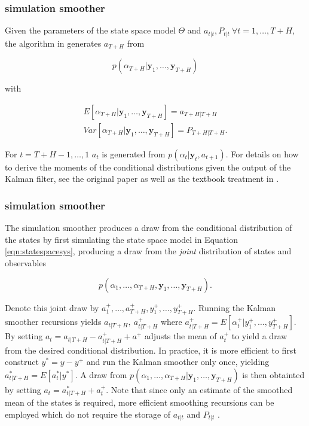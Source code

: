 \documentclass[notitlepage,a4paper,12pt]{article}
\begin{document}
\subsubsection{\citet{carterkohn1994_biomtr} simulation smoother}

Given the parameters of the state space model $\Theta$ and  $a_{t|t}, P_{t|t} \: \forall t = 1, \dots, T+H$, the algorithm in \citet{carterkohn1994_biomtr} generates $a_{T+H}$ from 

$$
p(\alpha_{T+H}|\mathbf{y}_1, \dots, \mathbf{y}_{T+H})
$$

\noindent with

\begin{align*}
    E[\alpha_{T+H}|\mathbf{y}_1, \dots, \mathbf{y}_{T+H}] = a_{T+H|T+H} \\
    Var[\alpha_{T+H}|\mathbf{y}_1, \dots, \mathbf{y}_{T+H}] = P_{T+H|T+H}.
\end{align*}

 For $t=T+H-1, \dots, 1$ $a_t$ is generated from $p(\alpha_{t}|\mathbf{y}_t, a_{t+1})$. For details on how to derive the moments of the conditional distributions given the output of the Kalman filter, see the original paper as well as the textbook treatment in \citet{KimNelson1999mit}.

 \subsubsection{\citet{durbinkoopman2002_biomtr} simulation smoother}

The \citet{durbinkoopman2002_biomtr} simulation smoother produces a draw from the conditional distribution of the states by first simulating the state space model in Equation \ref{eqn:statespacesys}, producing a draw from the \textit{joint} distribution of states and observables

$$p(\alpha_{1}, \dots, \alpha_{T+H}, \mathbf{y}_1, \dots, \mathbf{y}_{T+H}).$$

Denote this joint draw by $a^+_1, \dots, a^+_{T+H}, y^+_1, \dots, y^+_{T+H}$. Running the Kalman smoother recursions yields $a_{t|T+H}, \: a^+_{t|T+H}$ where $a^+_{t|T+H} = E[\alpha^+_t|y^+_1, \dots, y^+_{T+H}]$.  By setting $a_t = a_{t|T+H} - a^+_{t|T+H} + a^+$ adjusts the mean of $a^+_t$ to yield a draw from the desired conditional distribution. In practice, it is more efficient to first construct $y^* = y-y^+$ and run the Kalman smoother only once, yielding $a^*_{t|T+H} = E[a^*_t|y^*]$. A draw from $p(\alpha_{1}, \dots, \alpha_{T+H}|\mathbf{y}_1, \dots, \mathbf{y}_{T+H})$ is then obtainted by setting $a_t = a^*_{t|T+H} + a^+_t$. Note that since only an estimate of the smoothed mean of the states is required, more efficient smoothing recursions can be employed which do not require the storage of $a_{t|t}$ and $P_{t|t}$ \citep[see][ch. 4.4.2]{durbinkoopman2002_biomtr}.
\end{document}
